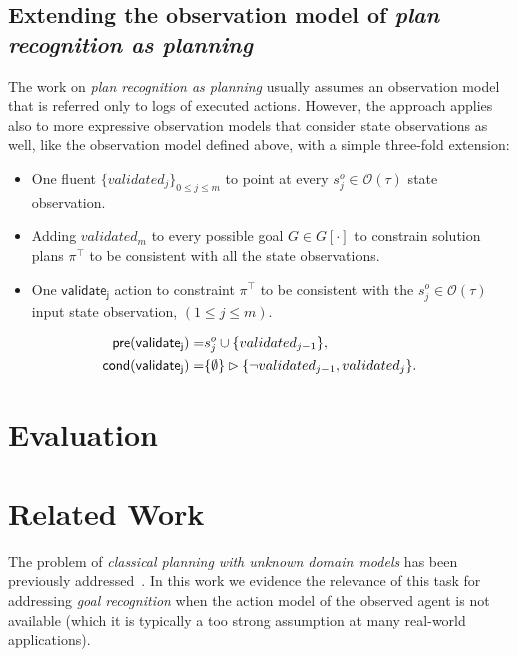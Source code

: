\documentclass{article}
\newcommand{\pre}{\mathsf{pre}}     %
\newcommand{\cond}{\mathsf{cond}}   %
\begin{document}
\subsection{Extending the observation model of {\em plan recognition as planning}}
The work on {\em plan recognition as planning} usually assumes an observation model that is referred only to logs of executed actions. However, the approach applies also to more expressive observation models that consider state observations as well, like the observation model defined above, with a simple three-fold extension:
\begin{itemize}
\item One fluent $\{validated_j\}_{0\leq j\leq m}$ to point at every $s_j^o\in\mathcal{O}(\tau)$ state observation.
\item Adding $validated_m$ to every possible goal $G\in G[\cdot]$ to constrain solution plans $\pi^\top$ to be consistent with all the state observations.
\item One $\mathsf{validate_{j}}$ action to constraint $\pi^\top$ to be consistent with the $s_j^o\in\mathcal{O}(\tau)$ input state observation, {\small $(1\leq j\leq m)$}.  
\end{itemize}
\begin{small}
\begin{align*}
\hspace*{7pt}\pre(\mathsf{validate_{j}})=&s_j^o\cup\{validated_{j-1}\},\\
\cond(\mathsf{validate_{j}})=&\{\emptyset\}\rhd\{\neg validated_{j-1}, validated_j\}.
\end{align*}
\end{small}



\section{Evaluation}
\label{sec:evaluation}

\section{Related Work}
\label{sec:evaluation}
The problem of {\em classical planning with unknown domain models} has been previously addressed~\cite{SternJ17}. In this work we evidence the relevance of this task for addressing {\em goal recognition} when the action model of the observed agent is not available (which it is typically a too strong assumption at many real-world applications).   
\end{document}
